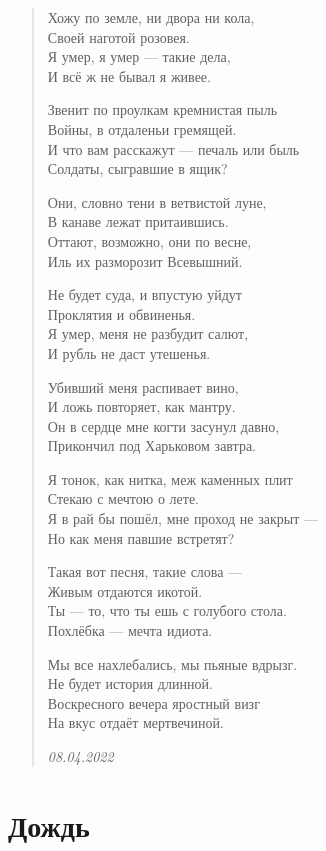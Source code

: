 \documentclass[a4paper,12pt,fleqn]{book}\usepackage{polyglossia}\setdefaultlanguage[babelshorthands=true]{russian}\setotherlanguage{english}\defaultfontfeatures{Ligatures=TeX,Mapping=tex-text}\usepackage{xcolor}\newcommand{\ml}[3]{#2}
\begin{document}
\begin{verse}

Хожу по земле, ни двора ни кола,\\
Своей наготой розовея.\\
Я умер, я умер --- такие дела,\\
И всё ж не бывал я живее.

Звенит по проулкам кремнистая пыль\\
Войны, в отдаленьи гремящей.\\
И что вам расскажут --- печаль или быль\\
Солдаты, сыгравшие в ящик?

Они, словно тени в ветвистой луне,\\
В канаве лежат притаившись.\\
Оттают, возможно, они по весне,\\
Иль их разморозит Всевышний.

Не будет суда, и впустую уйдут\\
Проклятия и обвиненья.\\
Я умер, меня не разбудит салют,\\
И рубль не даст утешенья.

Убивший меня распивает вино,\\
И ложь повторяет, как мантру.\\
Он в сердце мне когти засунул давно,\\
Прикончил под Харьковом завтра.

Я тонок, как нитка, меж каменных плит\\
Стекаю с мечтою о лете.\\
Я в рай бы пошёл, мне проход не закрыт ---\\
Но как меня павшие встретят?

Такая вот песня, такие слова ---\\
Живым отдаются икотой.\\
Ты --- то, что ты ешь с голубого стола.\\
Похлёбка --- мечта идиота.

Мы все нахлебались, мы пьяные вдрызг.\\
Не будет история длинной.\\
Воскресного вечера яростный визг\\
На вкус отдаёт мертвечиной.

\emph{08.04.2022}
\end{verse}

\newpage
\section{Дождь}
\end{document}
